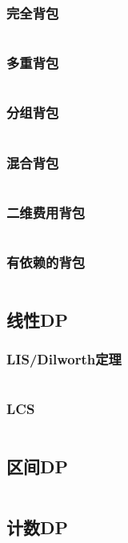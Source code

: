 \documentclass[a4paper,10pt]{article}
\begin{document}
\subsubsection{完全背包}
\inputminted[breaklines, linenos]{c++}{dp/bag/comp.cc}
\subsubsection{多重背包}
\inputminted[breaklines, linenos]{c++}{dp/bag/mul.cc}
\subsubsection{分组背包}
\inputminted[breaklines, linenos]{c++}{dp/bag/group.cc}
\subsubsection{混合背包}
\inputminted[breaklines, linenos]{c++}{dp/bag/mix.cc}
\subsubsection{二维费用背包}
\inputminted[breaklines, linenos]{c++}{dp/bag/2di.cc}
\subsubsection{有依赖的背包}
\inputminted[breaklines, linenos]{c++}{dp/bag/dep.cc}

\subsection{线性DP}
\subsubsection{LIS/Dilworth定理}
\inputminted[breaklines, linenos]{c++}{dp/linear/lis.cc}
\subsubsection{LCS}
\inputminted[breaklines, linenos]{c++}{dp/linear/lcs.cc}
\subsection{区间DP}
\inputminted[breaklines, linenos]{c++}{dp/interval.cc}
\subsection{计数DP}
\inputminted[breaklines, linenos]{c++}{dp/jishu.cc}
\end{document}
